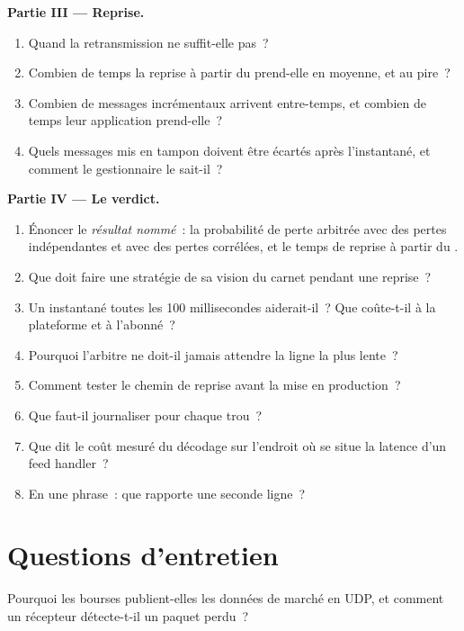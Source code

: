 \begin{problem}
\medskip\noindent\textbf{Partie III --- Reprise.}
\begin{enumerate}[resume]
\item Quand la retransmission ne suffit-elle pas~?
\item Combien de temps la reprise à partir du  prend-elle en moyenne, et au pire~?
\item Combien de messages incrémentaux arrivent entre-temps, et combien de temps leur application prend-elle~?
\item Quels messages mis en tampon doivent être écartés après l'instantané, et comment le gestionnaire le sait-il~?
\end{enumerate}

\medskip\noindent\textbf{Partie IV --- Le verdict.}
\begin{enumerate}[resume]
\item Énoncer le \emph{résultat nommé}~: la probabilité de perte arbitrée avec des pertes indépendantes et avec des pertes corrélées, et
le temps de reprise à partir du .
\item Que doit faire une stratégie de sa vision du carnet pendant une reprise~?
\item Un instantané toutes les 100 millisecondes aiderait-il~? Que coûte-t-il à la plateforme et à l'abonné~?
\item Pourquoi l'arbitre ne doit-il jamais attendre la ligne la plus lente~?
\item Comment tester le chemin de reprise avant la mise en production~?
\item Que faut-il journaliser pour chaque trou~?
\item Que dit le coût mesuré du décodage sur l'endroit où se situe la latence d'un feed handler~?
\item En une phrase~: que rapporte une seconde ligne~?
\end{enumerate}
\end{problem}

\section{Questions d'entretien}

\begin{interviewq}\label{iq:ll:protocols-ii-binary-exchange-protocols:1}
Pourquoi les bourses publient-elles les données de marché en  UDP, et comment un récepteur détecte-t-il un paquet perdu~?
\end{interviewq}

